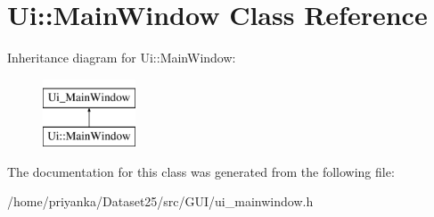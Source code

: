 \hypertarget{classUi_1_1MainWindow}{\section{\-Ui\-:\-:\-Main\-Window \-Class \-Reference}
\label{classUi_1_1MainWindow}
}
\-Inheritance diagram for \-Ui\-:\-:\-Main\-Window\-:\begin{figure}[H]
\begin{center}
\leavevmode
\includegraphics[height=2.000000cm]{classUi_1_1MainWindow}
\end{center}
\end{figure}


\-The documentation for this class was generated from the following file\-:\begin{DoxyCompactItemize}
\item 
/home/priyanka/\-Dataset25/src/\-G\-U\-I/ui\-\_\-mainwindow.\-h\end{DoxyCompactItemize}
